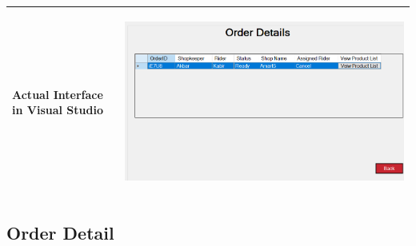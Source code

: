 \documentclass[12pt,a4paper]{article}
\begin{document}
\begin{longtable}{| p{3cm}|p{12cm}|}
Actual Interface in Visual Studio  & \begin{center} \includegraphics[scale=0.3]{./User Interface1/UI-031 Order Summary@1x.png}\end{center}  \\ \hline

\end{longtable}
\subsection{Order Detail}
\end{document}
